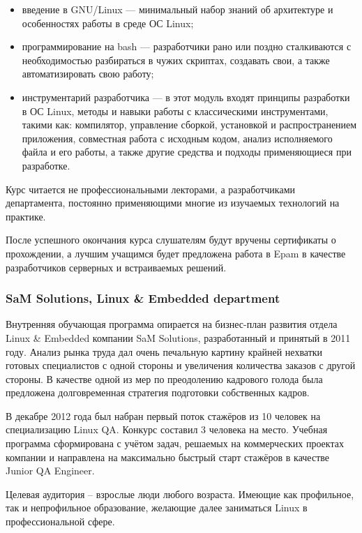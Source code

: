 \documentclass[10pt, a5paper]{article}
\begin{document}
\begin{itemize}
  \item введение в GNU/Linux --- минимальный набор знаний об архитектуре и особенностях работы в среде ОС Linux;
  \item программирование на bash --- разработчики рано или поздно сталкиваются с необходимостью разбираться в чужих скриптах, создавать свои, а также автоматизировать свою работу;
  \item инструментарий разработчика --- в этот модуль входят принципы разработки в ОС Linux, методы и навыки работы с классическими инструментами, такими как: компилятор, управление сборкой, установкой и распространением приложения, совместная работа с исходным кодом, анализ исполняемого файла и его работы, а также другие средства и подходы применяющиеся при разработке.
\end{itemize}

Курс читается не профессиональными лекторами, а разработчиками департамента, постоянно применяющими многие из изучаемых технологий на практике.

После успешного окончания курса слушателям будут вручены сертификаты о прохождении, а лучшим учащимся будет предложена работа в Epam в качестве разработчиков серверных и встраиваемых решений.

\subsubsection*{SaM Solutions, Linux \& Embedded department}

Внутренняя обучающая программа опирается на бизнес-план развития отдела Linux \& Embedded компании SaM Solutions, разработанный и принятый в 2011 году. Анализ рынка труда дал очень печальную картину крайней нехватки готовых специалистов с одной стороны и увеличения количества заказов с другой стороны. В качестве одной из мер по преодолению кадрового голода была предложена долговременная стратегия подготовки собственных кадров.

В декабре 2012 года был набран первый поток стажёров из 10 человек на специализацию Linux QA. Конкурс составил 3 человека на место. Учебная программа сформирована с учётом задач, решаемых на коммерческих проектах компании и направлена на максимально быстрый старт стажёров в качестве Junior QA Engineer.

Целевая аудитория -- взрослые люди любого возраста. Имеющие как профильное, так и непрофильное образование, желающие далее заниматься Linux в профессиональной сфере.
\end{document}

